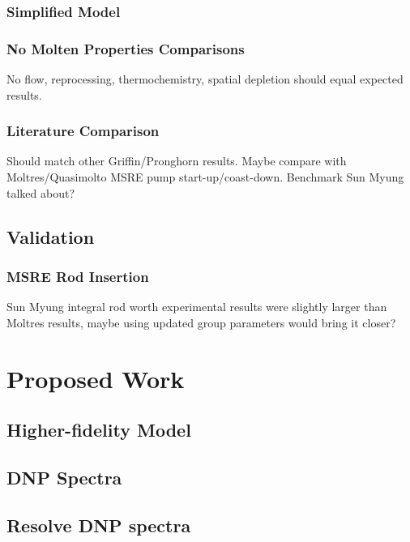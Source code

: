 \documentclass[edeposit,fullpage,hidelinks]{uiucthesis2018}
\begin{document}
\subsection{Simplified Model}

\subsection{No Molten Properties Comparisons}

No flow, reprocessing, thermochemistry, spatial depletion should equal expected results.

\subsection{Literature Comparison}

Should match other Griffin/Pronghorn results. Maybe compare with Moltres/Quasimolto MSRE pump start-up/coast-down. Benchmark Sun Myung talked about?

\section{Validation}

\subsection{MSRE Rod Insertion}
Sun Myung integral rod worth experimental results were slightly larger than Moltres results, maybe using updated group parameters would bring it closer?

\chapter{Proposed Work}

\section{Higher-fidelity Model}



\section{DNP Spectra}



\section{Resolve DNP spectra}
\end{document}
